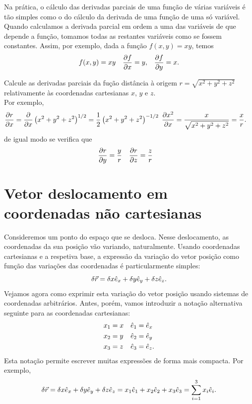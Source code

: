 Na prática, o cálculo das derivadas parciais de uma função de várias variáveis é
tão simples como o do cálculo da derivada de uma função de uma só variável.
Quando calculamos a derivada parcial em ordem a uma das variáveis de que depende
a função, tomamos todas as restantes variáveis como se fossem constantes. Assim,
por exemplo, dada a função $f(x,y)=xy$, temos
\begin{align*}
f(x,y)&=xy&\frac{\partial f}{\partial x}&=y,&\frac{\partial f}{\partial y}=x.
\end{align*}

\begin{examples}
\item Calcule as derivadas parciais da fução distância à origem
$r=\sqrt{x^2+y^2+z^2}$ relativamente às coordenadas cartesianas $x$, $y$ e $z$.
\\
Por exemplo, 
\begin{align*}
\frac{\partial r}{\partial x}&=\frac{\partial }{\partial x}\left(x^2+y^2+z^2\right)^{1/2}=
    \frac{1}{2}\left(x^2+y^2+z^2\right)^{-1/2}\;\frac{\partial x^2}{\partial x}
=\frac{x}{\sqrt{x^2+y^2+z^2}}=\frac{x}{r}.
\end{align*}
de igual modo se verifica que
\begin{align*}
\frac{\partial r}{\partial y}&=\frac{y}{r}& \frac{\partial r}{\partial z}&=\frac{z}{r}
\end{align*}
\end{examples}

\section{Vetor deslocamento em coordenadas não cartesianas}
Consideremos um ponto do espaço que se desloca.  Nesse deslocamento, as
coordenadas da sua posição vão variando, naturalmente. Usando coordenadas
cartesianas e a respetiva base, a expressão da variação do vetor posição como
função das variações das coordenadas é particularmente simples:
\begin{equation*}
  \delta \vec r= \delta x\he_x+\delta y\he_y+\delta z\he_z.
\end{equation*}
Vejamos agora como exprimir esta variação do vetor posição usando sistemas de
coordenadas arbitrários. Antes, porém, vamos introduzir a notação alternativa
seguinte para as coordenadas cartesianas:
\begin{align*}
  x_1&=x&\hat e_1&=\hat e_x\\
  x_2&=y&\hat e_2&=\hat e_y\\
  x_3&=z&\hat e_3&=\hat e_z.
\end{align*}
Esta notação permite escrever muitas expressões de forma mais compacta. Por
exemplo,
\begin{equation}\label{eq:drcart}
  \delta\vec r= \delta x\he_x+\delta y\he_y+\delta z\he_z
  =x_1\he_1+ x_2\he_2+ x_3\he_3=\sum_{i=1}^3x_i\he_i.
\end{equation}

